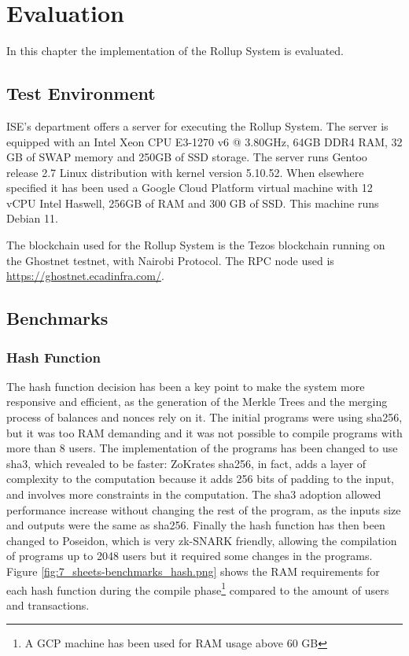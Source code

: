 \chapter{Evaluation\label{cha:chapter7}}

In this chapter the implementation of the Rollup System is evaluated.



\section{Test Environment\label{sec:testenvir}}

ISE's department offers a server for executing the Rollup System. The server is equipped with an Intel Xeon CPU E3-1270 v6 @ 3.80GHz, 64GB DDR4 RAM, 32 GB of SWAP memory and 250GB of SSD storage. The server runs Gentoo release 2.7 Linux distribution with kernel version 5.10.52. When elsewhere specified it has been used a Google Cloud Platform virtual machine with 12 vCPU Intel Haswell, 256GB of RAM and 300 GB of SSD. This machine runs Debian 11.

The blockchain used for the Rollup System is the Tezos blockchain running on the Ghostnet testnet, with Nairobi Protocol. The RPC node used is \url{https://ghostnet.ecadinfra.com/}.


\section{Benchmarks\label{sec:benchmarks}}

\subsection{Hash Function\label{subsec:6_hashfunc}}

The hash function decision has been a key point to make the system more responsive and efficient, as the generation of the Merkle Trees and the merging process of balances and nonces rely on it. The initial programs were using sha256, but it was too RAM demanding and it was not possible to compile programs with more than 8 users. The implementation of the programs has been changed to use sha3, which revealed to be faster: ZoKrates sha256, in fact, adds a layer of complexity to the computation because it adds 256 bits of padding to the input, and involves more constraints in the computation. The sha3 adoption allowed performance increase without changing the rest of the program, as the inputs size and outputs were the same as sha256.
Finally the hash function has then been changed to Poseidon, which is very zk-SNARK friendly, allowing the compilation of programs up to 2048 users but it required some changes in the programs. Figure \ref{fig:7_sheets-benchmarks_hash.png} shows the RAM requirements for each hash function during the compile phase\footnote{A GCP machine has been used for RAM usage above 60 GB} compared to the amount of users and transactions.

